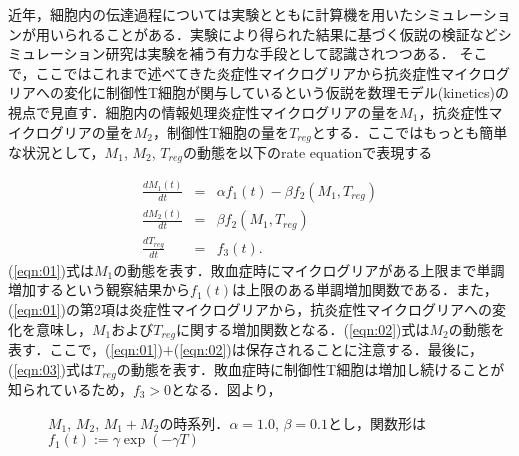 \documentclass{jsarticle}
\begin{document}
近年，細胞内の伝達過程については実験とともに計算機を用いたシミュレーションが用いられることがある．実験により得られた結果に基づく仮説の検証などシミュレーション研究は実験を補う有力な手段として認識されつつある．
そこで，ここではこれまで述べてきた炎症性マイクログリアから抗炎症性マイクログリアへの変化に制御性T細胞が関与しているという仮説を数理モデル(kinetics)の視点で見直す．細胞内の情報処理炎症性マイクログリアの量を$M_1$，抗炎症性マイクログリアの量を$M_2$，制御性T細胞の量を$T_{reg}$とする．ここではもっとも簡単な状況として，$M_1$, $M_2$, $T_{reg}$の動態を以下のrate equationで表現する

\begin{eqnarray}
  \label{eqn:01}
  \frac{dM_{1}(t)}{dt} &=& \alpha f_1(t)- \beta f_2(M_1, T_{reg}) \\
  \label{eqn:02}
  \frac{dM_2(t)}{dt} &=& \beta f_2(M_1, T_{reg}) \\
  \label{eqn:03}
  \frac{dT_{reg}}{dt} &=& f_3(t).
\end{eqnarray}
(\ref{eqn:01})式は$M_1$の動態を表す．敗血症時にマイクログリアがある上限まで単調増加するという観察結果から$f_1(t)$は上限のある単調増加関数である．また，(\ref{eqn:01})の第2項は炎症性マイクログリアから，抗炎症性マイクログリアへの変化を意味し，$M_1$および$T_{reg}$に関する増加関数となる．(\ref{eqn:02})式は$M_2$の動態を表す．ここで，(\ref{eqn:01})$+$(\ref{eqn:02})は保存されることに注意する．最後に，(\ref{eqn:03})式は$T_{reg}$の動態を表す．敗血症時に制御性T細胞は増加し続けることが知られているため，$f_3>0$となる．図より，

\begin{figure}[h]
  \centering
      \caption{$M_1$, $M_2$, $M_1+M_2$の時系列．$\alpha=1.0$, $\beta=0.1$とし，関数形は$f_1(t):= \gamma\exp{(-\gamma T)}$}
      \label{fig:01}
  \end{figure}
\end{document}
